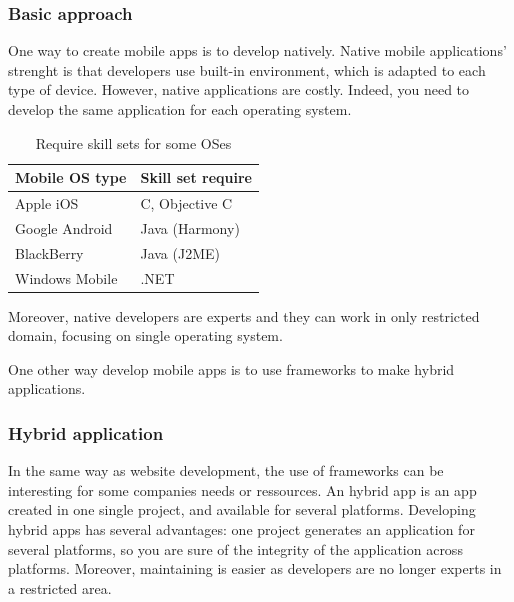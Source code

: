 \documentclass{article}
\begin{document}
                    \subsubsection{Basic approach}
                        One way to create mobile apps is to develop natively. Native mobile applications' strenght is that developers use 
                        built-in environment, which is adapted to each type of device. However, native applications are costly. Indeed, you need
                        to develop the same application for each operating system. 
                        \begin{table}[H]
                            \centering
                            \caption{Require skill sets for some OSes}
                            \begin{tabular}{|l|l|}
                                \hline
                                \textbf{Mobile OS type} & \textbf{Skill set require} \\ \hline
                                Apple iOS               & C, Objective C             \\ \hline
                                Google Android          & Java (Harmony)             \\ \hline
                                BlackBerry              & Java (J2ME)                \\ \hline
                                Windows Mobile          & .NET                       \\ \hline
                            \end{tabular}
                        \end{table}
                        Moreover, native developers are experts and they can work in
                        only restricted domain, focusing on single operating system. 
                        
                        One other way develop mobile apps is to use frameworks to make hybrid applications.

                    \subsubsection{Hybrid application}
                        In the same way as website development, the use of frameworks can be interesting for some companies needs or ressources.
                        An hybrid app is an app created in one single project, and available for several platforms.
                        Developing hybrid apps has several advantages: one project generates an application for several platforms, so you 
                        are sure of the integrity of the application across platforms. Moreover, maintaining is easier as developers are no longer
                        experts in a restricted area.
\end{document}
